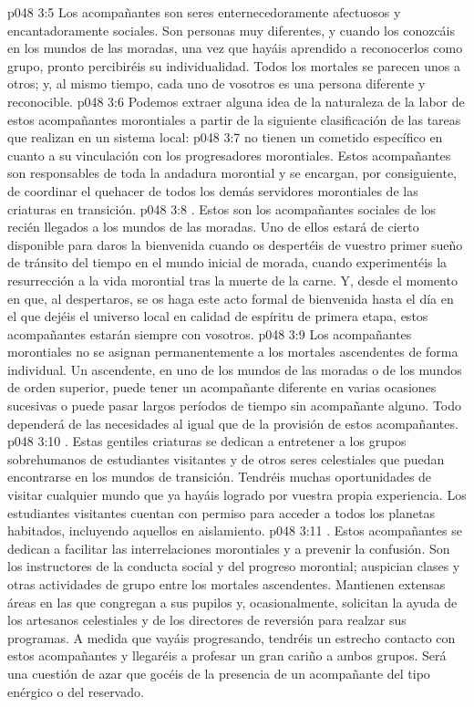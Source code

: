 \vs p048 3:5 Los acompañantes son seres enternecedoramente afectuosos y encantadoramente sociales. Son personas muy diferentes, y cuando los conozcáis en los mundos de las moradas, una vez que hayáis aprendido a reconocerlos como grupo, pronto percibiréis su individualidad. Todos los mortales se parecen unos a otros; y, al mismo tiempo, cada uno de vosotros es una persona diferente y reconocible.
\vs p048 3:6 \pc Podemos extraer alguna idea de la naturaleza de la labor de estos acompañantes morontiales a partir de la siguiente clasificación de las tareas que realizan en un sistema local:
\vs p048 3:7  no tienen un cometido específico en cuanto a su vinculación con los progresadores morontiales. Estos acompañantes son responsables de toda la andadura morontial y se encargan, por consiguiente, de coordinar el quehacer de todos los demás servidores morontiales de las criaturas en transición.
\vs p048 3:8 . Estos son los acompañantes sociales de los recién llegados a los mundos de las moradas. Uno de ellos estará de cierto disponible para daros la bienvenida cuando os despertéis de vuestro primer sueño de tránsito del tiempo en el mundo inicial de morada, cuando experimentéis la resurrección a la vida morontial tras la muerte de la carne. Y, desde el momento en que, al despertaros, se os haga este acto formal de bienvenida hasta el día en el que dejéis el universo local en calidad de espíritu de primera etapa, estos acompañantes estarán siempre con vosotros.
\vs p048 3:9 Los acompañantes morontiales no se asignan permanentemente a los mortales ascendentes de forma individual. Un ascendente, en uno de los mundos de las moradas o de los mundos de orden superior, puede tener un acompañante diferente en varias ocasiones sucesivas o puede pasar largos períodos de tiempo sin acompañante alguno. Todo dependerá de las necesidades al igual que de la provisión de estos acompañantes.
\vs p048 3:10 . Estas gentiles criaturas se dedican a entretener a los grupos sobrehumanos de estudiantes visitantes y de otros seres celestiales que puedan encontrarse en los mundos de transición. Tendréis muchas oportunidades de visitar cualquier mundo que ya hayáis logrado por vuestra propia experiencia. Los estudiantes visitantes cuentan con permiso para acceder a todos los planetas habitados, incluyendo aquellos en aislamiento.
\vs p048 3:11 . Estos acompañantes se dedican a facilitar las interrelaciones morontiales y a prevenir la confusión. Son los instructores de la conducta social y del progreso morontial; auspician clases y otras actividades de grupo entre los mortales ascendentes. Mantienen extensas áreas en las que congregan a sus pupilos y, ocasionalmente, solicitan la ayuda de los artesanos celestiales y de los directores de reversión para realzar sus programas. A medida que vayáis progresando, tendréis un estrecho contacto con estos acompañantes y llegaréis a profesar un gran cariño a ambos grupos. Será una cuestión de azar que gocéis de la presencia de un acompañante del tipo enérgico o del reservado.
